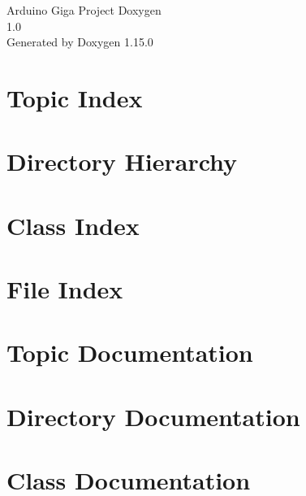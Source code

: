 \documentclass[twoside]{book}
\newcommand{\+}{\discretionary{\mbox{\scriptsize$\hookleftarrow$}}{}{}}
\newcommand{\clearemptydoublepage}{%
    \newpage{\pagestyle{empty}\cleardoublepage}%
  }
\begin{document}
  \raggedbottom
    \hypersetup{pageanchor=false,
                bookmarksnumbered=true,
                pdfencoding=unicode
               }
  \begin{titlepage}
  \vspace*{7cm}
  \begin{center}%
  {\Large Arduino Giga Project Doxygen}\\
  [1ex]\large 1.\+0 \\
  \vspace*{1cm}
  {\large Generated by Doxygen 1.15.0}\\
  \end{center}
  \end{titlepage}
  \clearemptydoublepage
  \tableofcontents
  \clearemptydoublepage
  \hypersetup{pageanchor=true}

\chapter{Topic Index}

\chapter{Directory Hierarchy}

\chapter{Class Index}

\chapter{File Index}

\chapter{Topic Documentation}


\chapter{Directory Documentation}



\chapter{Class Documentation}




\end{document}

